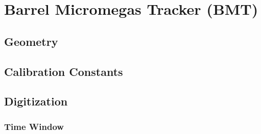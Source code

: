 \section{Barrel Micromegas Tracker (BMT)}


\subsection{Geometry}

\subsection{Calibration Constants}


\subsection{Digitization}

\subsubsection{Time Window}

